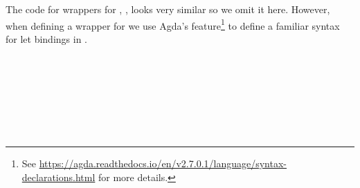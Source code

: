 The code for wrappers for , ,  looks very similar
so we omit it here.  However, when defining a wrapper for  we
use Agda's  feature\footnote{See
\url{https://agda.readthedocs.io/en/v2.7.0.1/language/syntax-declarations.html}
for more details.} to define a familiar syntax for let bindings in .
\begin{code}[hide]%
%
\>[2]%
\>[1664I]\AgdaSymbol{:}\AgdaSpace{}%
\AgdaSpace{}%
\AgdaSymbol{\{}\AgdaSymbol{\}}\<%
\\
\>[1664I][@{}l@{\AgdaIndent{0}}]%
\>[7]\AgdaSpace{}%
\AgdaSymbol{(}\AgdaSpace{}%
\AgdaSymbol{(}\AgdaSpace{}%
\AgdaSpace{}%
\AgdaSpace{}%
\AgdaSymbol{)}\AgdaSpace{}%
\AgdaSymbol{(}\AgdaSpace{}%
\AgdaSymbol{)}\AgdaSpace{}%
\AgdaSpace{}%
\AgdaSpace{}%
\AgdaSymbol{(}\AgdaSpace{}%
\AgdaSpace{}%
\AgdaSpace{}%
\AgdaSymbol{)}\AgdaSpace{}%
\AgdaSymbol{(}\AgdaSpace{}%
\AgdaSymbol{))}\<%
\\
%
\>[7]\AgdaSpace{}%
\AgdaSpace{}%
\AgdaSpace{}%
\AgdaSymbol{(}\AgdaSpace{}%
\AgdaSymbol{)}\<%
\\
%
\>[2]\AgdaSpace{}%
\AgdaSpace{}%
\AgdaSymbol{=}\AgdaSpace{}%
\AgdaSpace{}%
\AgdaSymbol{(}\AgdaSpace{}%
\AgdaSpace{}%
\AgdaSymbol{\{}\AgdaSymbol{\}}\AgdaSpace{}%
\AgdaSpace{}%
\AgdaSpace{}%
\AgdaSpace{}%
\AgdaSpace{}%
\AgdaSpace{}%
\AgdaSpace{}%
\AgdaSpace{}%
\AgdaSymbol{)}\<%
\\
%
\\[\AgdaEmptyExtraSkip]%
%
\>[2]%
\>[1700I]\AgdaSymbol{:}\AgdaSpace{}%
\AgdaSpace{}%
\AgdaSymbol{\{}\AgdaSymbol{\}}\<%
\\
\>[.][@{}l@{}]\<[1700I]%
\>[8]\AgdaSpace{}%
\AgdaSymbol{(}\AgdaSpace{}%
\AgdaSymbol{(}\AgdaSpace{}%

\end{code}
